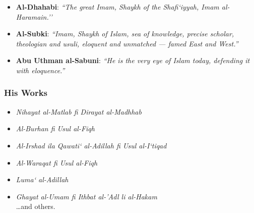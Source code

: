 \documentclass[
  a4paper,
  DIV=11,
  numbers=noendperiod]{scrartcl}
\providecommand{\tightlist}{%
  \setlength{\itemsep}{0pt}\setlength{\parskip}{0pt}}
\begin{document}
\begin{tcolorbox}[enhanced jigsaw, left=2mm, colframe=quarto-callout-note-color-frame, bottomrule=.15mm, titlerule=0mm, toprule=.15mm, opacityback=0, breakable, toptitle=1mm, colbacktitle=quarto-callout-note-color!10!white, rightrule=.15mm, title=\textcolor{quarto-callout-note-color}{\faInfo}\hspace{0.5em}{Praise from Scholars}, arc=.35mm, bottomtitle=1mm, leftrule=.75mm, opacitybacktitle=0.6, colback=white, coltitle=black]

\begin{itemize}
\tightlist
\item
  \textbf{Al-Dhahabi}: \emph{``The great Imam, Shaykh of the
  Shafi`iyyah, Imam al-Haramain.''}\\
\item
  \textbf{Al-Subki}: \emph{``Imam, Shaykh of Islam, sea of knowledge,
  precise scholar, theologian and usuli, eloquent and unmatched ---
  famed East and West.''}\\
\item
  \textbf{Abu Uthman al-Sabuni}: \emph{``He is the very eye of Islam
  today, defending it with eloquence.''}
\end{itemize}

\end{tcolorbox}

\subsubsection{His Works}\label{his-works}

\begin{itemize}
\tightlist
\item
  \emph{Nihayat al-Matlab fi Dirayat al-Madhhab}\\
\item
  \emph{Al-Burhan fi Usul al-Fiqh}\\
\item
  \emph{Al-Irshad ila Qawati` al-Adillah fi Usul al-I`tiqad}\\
\item
  \emph{Al-Waraqat fi Usul al-Fiqh}\\
\item
  \emph{Luma` al-Adillah}\\
\item
  \emph{Ghayat al-Umam fi Ithbat al-'Adl li al-Hakam}\\
  \ldots and others.
\end{itemize}
\end{document}
